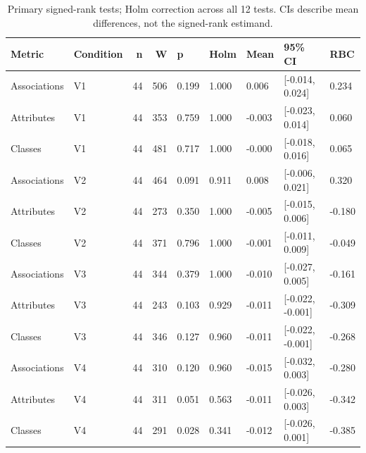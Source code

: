 \begin{table}

\caption{Primary signed-rank tests; Holm correction across all 12 tests. CIs describe mean differences, not the signed-rank estimand.}
\centering
\begin{tabular}[t]{llrrlllll}
\toprule
Metric & Condition & n & W & p & Holm & Mean & 95\% CI & RBC\\
\midrule
Associations & V1 & 44 & 506 & 0.199 & 1.000 & 0.006 & {}[-0.014, 0.024] & 0.234\\
Attributes & V1 & 44 & 353 & 0.759 & 1.000 & -0.003 & {}[-0.023, 0.014] & 0.060\\
Classes & V1 & 44 & 481 & 0.717 & 1.000 & -0.000 & {}[-0.018, 0.016] & 0.065\\
Associations & V2 & 44 & 464 & 0.091 & 0.911 & 0.008 & {}[-0.006, 0.021] & 0.320\\
Attributes & V2 & 44 & 273 & 0.350 & 1.000 & -0.005 & {}[-0.015, 0.006] & -0.180\\
\addlinespace
Classes & V2 & 44 & 371 & 0.796 & 1.000 & -0.001 & {}[-0.011, 0.009] & -0.049\\
Associations & V3 & 44 & 344 & 0.379 & 1.000 & -0.010 & {}[-0.027, 0.005] & -0.161\\
Attributes & V3 & 44 & 243 & 0.103 & 0.929 & -0.011 & {}[-0.022, -0.001] & -0.309\\
Classes & V3 & 44 & 346 & 0.127 & 0.960 & -0.011 & {}[-0.022, -0.001] & -0.268\\
Associations & V4 & 44 & 310 & 0.120 & 0.960 & -0.015 & {}[-0.032, 0.003] & -0.280\\
\addlinespace
Attributes & V4 & 44 & 311 & 0.051 & 0.563 & -0.011 & {}[-0.026, 0.003] & -0.342\\
Classes & V4 & 44 & 291 & 0.028 & 0.341 & -0.012 & {}[-0.026, 0.001] & -0.385\\
\bottomrule
\end{tabular}
\end{table}
